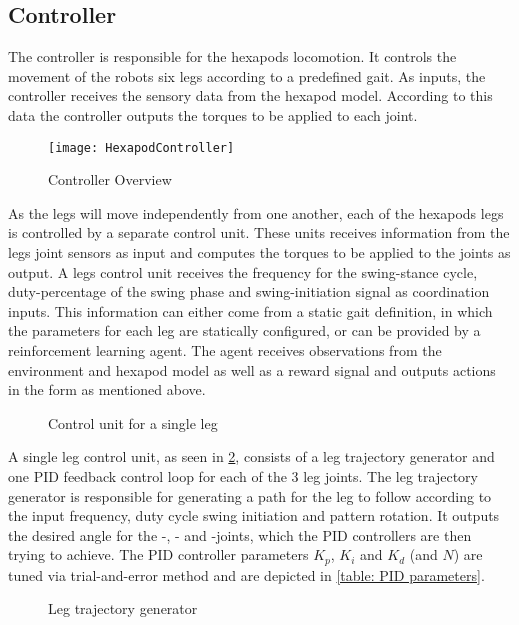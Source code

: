 \subsection{Controller}
The controller is responsible for the hexapods locomotion.
It controls the movement of the robots six legs according to a predefined gait.
As inputs, the controller receives the sensory data from the hexapod model.
According to this data the controller outputs the torques to be applied to each joint.

\begin{figure}
	\centerline{\texttt{[image: HexapodController]}}
	\caption{Controller Overview}
	\label{figure: Controller Overview}
\end{figure}
As the legs will move independently from one another, each of the hexapods legs is controlled by a separate control unit.
These units receives information from the legs joint sensors as input and computes the torques to be applied to the joints as output.
A legs control unit receives the frequency for the swing-stance cycle, duty-percentage of the swing phase and swing-initiation signal as coordination inputs.
This information can either come from a static gait definition, in which the parameters for each leg are statically configured, or can be provided by a reinforcement learning agent.
The agent receives observations from the environment and hexapod model as well as a reward signal and outputs actions in the form as mentioned above.

\begin{figure}
	\centerline{}
	\caption{Control unit for a single leg}
	\label{figure: Leg control unit}
\end{figure}

A single leg control unit, as seen in \ref{figure: Leg control unit}, consists of a leg trajectory generator and one PID feedback control loop for each of the 3 leg joints.
The leg trajectory generator is responsible for generating a path for the leg to follow according to the input frequency, duty cycle swing initiation and pattern rotation.
It outputs the desired angle for the \textalpha-, \textbeta- and \textgamma-joints, which the PID controllers are then trying to achieve.
The PID controller parameters $K_p$, $K_i$ and $K_d$ (and $N$) are tuned via trial-and-error method and are depicted in \ref{table: PID parameters}.

\begin{figure}
	\centerline{}
	\caption{Leg trajectory generator}
	\label{figure: Leg trajectory generator}
\end{figure}

